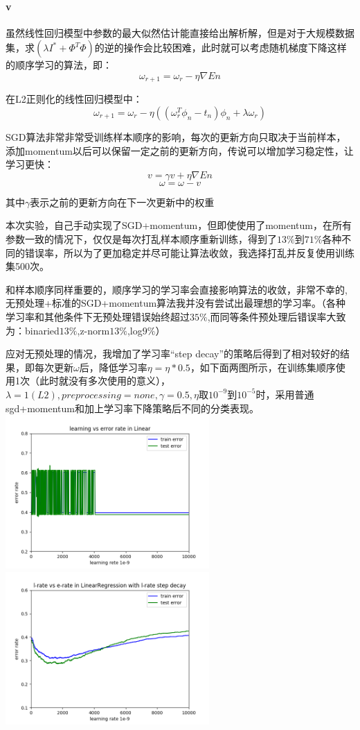 \documentclass[hyperref,UTF8]{ctexart}
\begin{document}
\paragraph{v}虽然线性回归模型中参数的最大似然估计能直接给出解析解，但是对于大规模数据集，求$(\lambda I^{*} +\Phi^T \Phi)$的逆的操作会比较困难，此时就可以考虑随机梯度下降这样的顺序学习的算法，即：
\[\omega_{r+1}=\omega_r-\eta\nabla En \]
\par 在L2正则化的线性回归模型中：
\[\omega_{r+1}=\omega_r-\eta((\omega_r^T \phi_n - t_n)\phi_n + \lambda \omega_r) \]
\par SGD算法非常非常受训练样本顺序的影响，每次的更新方向只取决于当前样本，添加momentum以后可以保留一定之前的更新方向，传说可以增加学习稳定性，让学习更快：
\[v=\gamma v + \eta\nabla En  \]
\[\omega = \omega - v\]
\par 其中$\gamma$表示之前的更新方向在下一次更新中的权重
\par 本次实验，自己手动实现了SGD+momentum，但即使使用了momentum，在所有参数一致的情况下，仅仅是每次打乱样本顺序重新训练，得到了$13\%$到$71\%$各种不同的错误率，所以为了更加稳定并尽可能让算法收敛，我选择打乱并反复使用训练集500次。
\par 和样本顺序同样重要的，顺序学习的学习率会直接影响算法的收敛，非常不幸的,无预处理+标准的SGD+momentum算法我并没有尝试出最理想的学习率。（各种学习率和其他条件下无预处理错误始终超过$35\%$,而同等条件预处理后错误率大致为：binaried$13\%$,z-norm$13\%$,log$9\%$）
\par 应对无预处理的情况，我增加了学习率“step decay”的策略后得到了相对较好的结果，即每次更新$\omega$后，降低学习率$\eta = \eta *0.5$，如下面两图所示，在训练集顺序使用1次（此时就没有多次使用的意义），$\lambda = 1 (L2), preprocessing = none,\gamma = 0.5,\eta$取$10^{-9}$到$10^{-5}$时，采用普通sgd+momentum和加上学习率下降策略后不同的分类表现。\\
\includegraphics[height=2.3in]{Learningrate1.png}
\includegraphics[height=2.3in]{Learningrate2.png}
\end{document}
